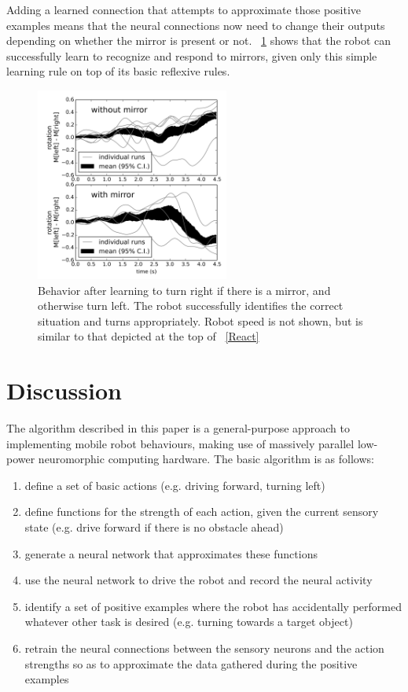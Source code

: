 \documentclass[conference]{IEEEtran}
\begin{document}
Adding a learned connection that attempts to approximate those positive
examples means that the neural connections now need to change their outputs
depending on whether the mirror is present or not.  \figurename~\ref{Right} shows 
that the robot can successfully learn to recognize and respond to mirrors,
given only this simple learning rule on top of its basic reflexive rules.

\begin{figure}[!t]
\centering
\includegraphics[width=2.5in]{learn-mirror/learnmirror.png}
\caption{Behavior after learning to turn right if there is a mirror, and otherwise turn left. The robot successfully identifies the correct situation and turns appropriately. Robot speed is not shown, but is similar to that depicted at the top of \figurename~\ref{React}}
\label{Right}
\end{figure}

\section{Discussion}
The algorithm described in this paper is a general-purpose approach to
implementing mobile robot behaviours, 
making use of massively parallel low-power neuromorphic computing hardware. 
The basic algorithm is as follows:

\begin{enumerate}
\item define a set of basic actions (e.g. driving forward, turning left)
\item define functions for the strength of each action, given the
current sensory state (e.g. drive forward if there is no obstacle ahead)
\item generate a neural network that approximates these functions
\item use the neural network to drive the robot and record the neural activity
\item identify a set of positive examples where the robot has accidentally
performed whatever other task is desired (e.g. turning towards a target object)
\item retrain the neural connections between the sensory neurons and the
action strengths so as to approximate the data gathered during the positive
examples
\end{enumerate}
\end{document}
